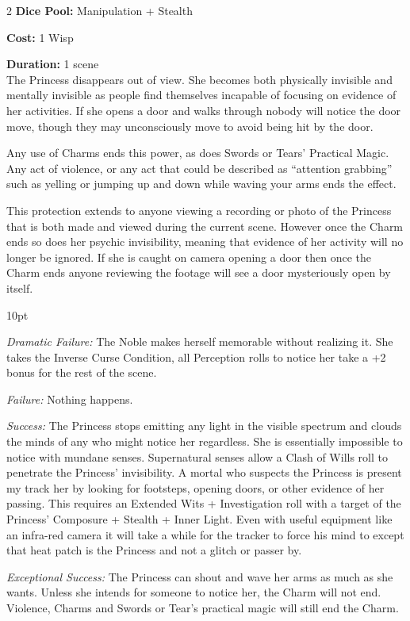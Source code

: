 \begin{multicols}{2}
\noindent \textbf{Dice Pool:} Manipulation + Stealth

\noindent \textbf{Cost:} 1 Wisp

\noindent \textbf{Duration:} 1 scene \\

\noindent The Princess disappears out of view. She becomes both physically invisible and mentally invisible as people find themselves incapable of focusing on evidence of her activities. If she opens a door and walks through nobody will notice the door move, though they may unconsciously move to avoid being hit by the door. 

Any use of Charms ends this power, as does Swords or Tears' Practical Magic. Any act of violence, or any act that could be described as \textquotedblleft attention grabbing\textquotedblright\, such as yelling or jumping up and down while waving your arms ends the effect. 

This protection extends to anyone viewing a recording or photo of the Princess that is both made and viewed during the current scene. However once the Charm ends so does her psychic invisibility, meaning that evidence of her activity will no longer be ignored. If she is caught on camera opening a door then once the Charm ends anyone reviewing the footage will see a door mysteriously open by itself. 

\begin{myindentpar}{10pt}

\emph{Dramatic Failure:} The Noble makes herself memorable without realizing it. She takes the Inverse Curse Condition, all Perception rolls to notice her take a +2 bonus for the rest of the scene.

\emph{Failure:} Nothing happens. 

\emph{Success:} The Princess stops emitting any light in the visible spectrum and clouds the minds of any who might notice her regardless. She is essentially impossible to notice with mundane senses. Supernatural senses allow a Clash of Wills roll to penetrate the Princess' invisibility. A mortal who suspects the Princess is present my track her by looking for footsteps, opening doors, or other evidence of her passing. This requires an Extended Wits + Investigation roll with a target of the Princess' Composure + Stealth + Inner Light. Even with useful equipment like an infra-red camera it will take a while for the tracker to force his mind to except that heat patch is the Princess and not a glitch or passer by. 

\emph{Exceptional Success:} The Princess can shout and wave her arms as much as she wants. Unless she intends for someone to notice her, the Charm will not end. Violence, Charms and Swords or Tear's practical magic will still end the Charm. 


\end{myindentpar}
\end{multicols}
